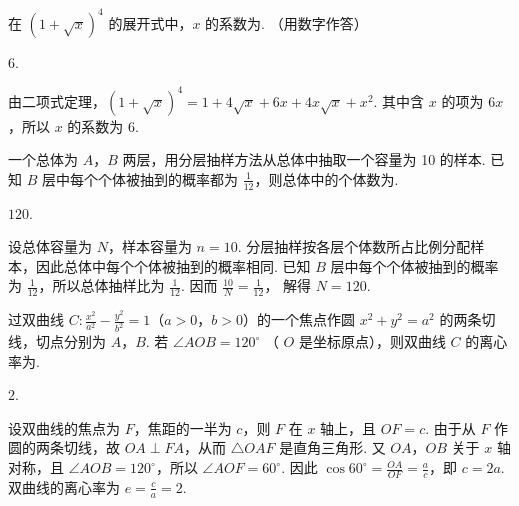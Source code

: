 \begin{problem}
在 \((1 + \sqrt{x})^4\) 的展开式中，\(x\) 的系数为\fillinblank{}. （用数字作答）
\end{problem}

\begin{answer}
\(6\).
\end{answer}

\begin{solution}
由二项式定理，\((1+\sqrt{x})^4=1+4\sqrt{x}+6x+4x\sqrt{x}+x^2\).
其中含 \(x\) 的项为 \(6x\)，所以 \(x\) 的系数为 \(6\).
\end{solution}

\begin{problem}
一个总体为 \(A\)，\(B\) 两层，用分层抽样方法从总体中抽取一个容量为 10 的样本. 已知 \(B\) 层中每个个体被抽到的概率都为 \(\frac{1}{12}\)，则总体中的个体数为\fillinblank{}.
\end{problem}

\begin{answer}
\(120\).
\end{answer}

\begin{solution}
设总体容量为 \(N\)，样本容量为 \(n=10\). 分层抽样按各层个体数所占比例分配样本，因此总体中每个个体被抽到的概率相同. 已知 \(B\) 层中每个个体被抽到的概率为 \(\frac{1}{12}\)，所以总体抽样比为 \(\frac{1}{12}\). 因而 \(\frac{10}{N}=\frac{1}{12}\)，
解得 \(N=120\).
\end{solution}

\begin{problem}
过双曲线 \(C: \frac{x^2}{a^2} - \frac{y^2}{b^2} = 1\)（\(a > 0\)，\(b > 0\)）的一个焦点作圆 \(x^2 + y^2 = a^2\) 的两条切线，切点分别为 \(A\)，\(B\). 若 \(\angle AOB = 120^\circ\) （ \(O\) 是坐标原点），则双曲线 \(C\) 的离心率为\fillinblank{}.
\end{problem}

\begin{answer}
\(2\).
\end{answer}

\begin{solution}
设双曲线的焦点为 \(F\)，焦距的一半为 \(c\)，则 \(F\) 在 \(x\) 轴上，且 \(OF=c\). 由于从 \(F\) 作圆的两条切线，故 \(OA\perp FA\)，从而 \(\triangle OAF\) 是直角三角形. 又 \(OA\)，\(OB\) 关于 \(x\) 轴对称，且 \(\angle AOB=120^\circ\)，所以 \(\angle AOF=60^\circ\). 因此 \(\cos60^\circ=\frac{OA}{OF}=\frac{a}{c}\)，即 \(c=2a\). 双曲线的离心率为 \(e=\frac{c}{a}=2\).
\end{solution}

